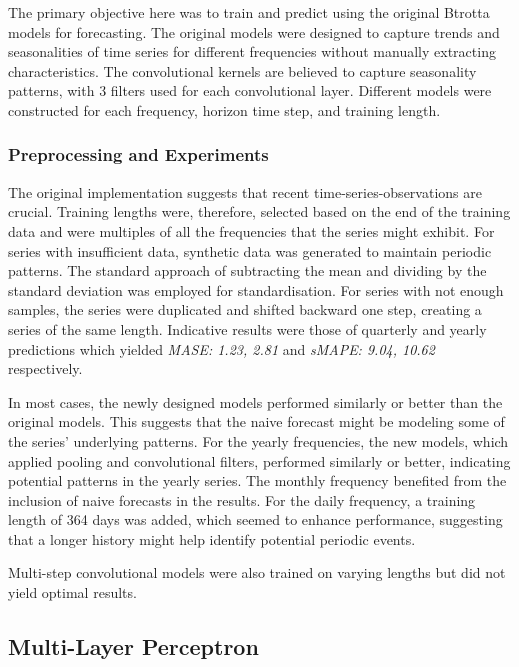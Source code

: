 \documentclass[conference]{IEEEtran}
\begin{document}
The primary objective here was to train and predict using the original Btrotta models\cite{cnn} for forecasting. The original models were designed to capture trends and seasonalities of time series for different frequencies without manually extracting characteristics. The convolutional kernels are believed to capture seasonality patterns, with 3 filters used for each convolutional layer. Different models were constructed for each frequency, horizon time step, and training length.

\subsubsection{Preprocessing and Experiments}

The original implementation suggests that recent time-series-observations are crucial. Training lengths were, therefore, selected based on the end of the training data and were multiples of all the frequencies that the series might exhibit. For series with insufficient data, synthetic data was generated to maintain periodic patterns. The standard approach of subtracting the mean and dividing by the standard deviation was employed for standardisation. For series with not enough samples, the series were duplicated and shifted backward one step, creating a series of the same length. Indicative results were those of quarterly and yearly predictions which yielded \textit{MASE: 1.23, 2.81} and \textit{sMAPE: 9.04, 10.62} respectively.

In most cases, the newly designed models performed similarly or better than the original models. This suggests that the naive forecast might be modeling some of the series' underlying patterns. For the yearly frequencies, the new models, which applied pooling and convolutional filters, performed similarly or better, indicating potential patterns in the yearly series. The monthly frequency benefited from the inclusion of naive forecasts in the results. For the daily frequency, a training length of 364 days was added, which seemed to enhance performance, suggesting that a longer history might help identify potential periodic events.

Multi-step convolutional models were also trained on varying lengths but did not yield optimal results.

\subsection{Multi-Layer Perceptron}
\end{document}
